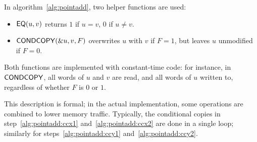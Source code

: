 \documentclass{llncs}
\begin{document}
In algorithm~\ref{alg:pointadd}, two helper functions are used:
\begin{itemize}
    \item $\text{\textsf{EQ}}(u,v)$ returns $1$ if $u = v$, $0$ if $u\neq v$.
    \item $\text{\textsf{CONDCOPY}}(\&u,v,F)$ overwrites $u$ with $v$ if
    $F = 1$, but leaves $u$ unmodified if $F = 0$.
\end{itemize}
Both functions are implemented with constant-time code: for instance, in
$\text{\textsf{CONDCOPY}}$, all words of $u$ and $v$ are read, and all words
of $u$ written to, regardless of whether $F$ is $0$ or $1$.

This description is formal; in the actual implementation, some
operations are combined to lower memory traffic. Typically, the
conditional copies in step~\ref{alg:pointadd:ccx1}
and~\ref{alg:pointadd:ccx2} are done in a single loop; similarly for
steps~\ref{alg:pointadd:ccy1} and~\ref{alg:pointadd:ccy2}.
\end{document}
